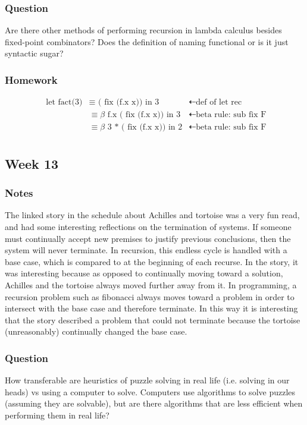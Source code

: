 \documentclass{article}
\theoremstyle{theorem}
\theoremstyle{definition}
\theoremstyle{remark}
\begin{document}
\subsubsection*{Question} Are there other methods of performing recursion in lambda calculus besides fixed-point combinators? Does the definition of naming functional or is it just syntactic sugar?

\subsubsection*{Homework}

\[
\begin{aligned}
  \text{ let fact(3)} &\equiv  \text{ ( fix (f.x x)) in 3} &\dashleftarrow\text{def of let rec}\\
  &\equiv\beta\text{ f.x ( fix (f.x x)) in 3} &\dashleftarrow\text{beta rule: sub fix F}\\
  &\equiv\beta\text{ 3 * ( fix (f.x x)) in 2} &\dashleftarrow\text{beta rule: sub fix F}\\
\end{aligned}
\]

\subsection{Week 13}

\subsubsection*{Notes} The linked story in the schedule about Achilles and tortoise was a very fun read, and had some interesting reflections on the termination of systems. If someone must continually accept new premises to justify previous conclusions, then the system will never terminate. In recursion, this endless cycle is handled with a base case, which is compared to at the beginning of each recurse. In the story, it was interesting because as opposed to continually moving toward a solution, Achilles and the tortoise always moved further away from it. In programming, a recursion problem such as fibonacci always moves toward a problem in order to intersect with the base case and therefore terminate. In this way it is interesting that the story described a problem that could not terminate because the tortoise (unreasonably) continually changed the base case.

\subsubsection*{Question} How transferable are heuristics of puzzle solving in real life (i.e. solving in our heads) vs using a computer to solve. Computers use algorithms to solve puzzles (assuming they are solvable), but are there algorithms that are less efficient when performing them in real life?
\end{document}
